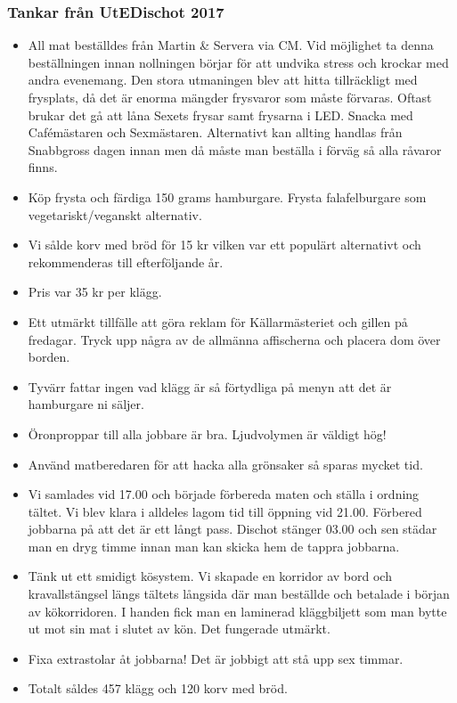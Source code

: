 \documentclass[10pt]{article}
\begin{document}
\subsubsection*{Tankar från UtEDischot 2017}
\begin{itemize}
	\item All mat beställdes från Martin \& Servera via CM. Vid möjlighet ta denna beställningen innan nollningen börjar för att undvika stress och krockar med andra evenemang. Den stora utmaningen blev att hitta tillräckligt med frysplats, då det är enorma mängder frysvaror som måste förvaras. Oftast brukar det gå att låna Sexets frysar samt frysarna i LED. Snacka med Cafémästaren och Sexmästaren. Alternativt kan allting handlas från Snabbgross dagen innan men då måste man beställa i förväg så alla råvaror finns.
    \item Köp frysta och färdiga 150 grams hamburgare. Frysta falafelburgare som vegetariskt/veganskt alternativ.
    \item Vi sålde korv med bröd för 15 kr vilken var ett populärt alternativt och rekommenderas till efterföljande år.
    \item Pris var 35 kr per klägg.
    \item Ett utmärkt tillfälle att göra reklam för Källarmästeriet och gillen på fredagar. Tryck upp några av de allmänna affischerna och placera dom över borden.
    \item Tyvärr fattar ingen vad klägg är så förtydliga på menyn att det är hamburgare ni säljer.
    \item Öronproppar till alla jobbare är bra. Ljudvolymen är väldigt hög!
    \item Använd matberedaren för att hacka alla grönsaker så sparas mycket tid.
    \item Vi samlades vid 17.00 och började förbereda maten och ställa i ordning tältet. Vi blev klara i alldeles lagom tid till öppning vid 21.00. Förbered jobbarna på att det är ett långt pass. Dischot stänger 03.00 och sen städar man en dryg timme innan man kan skicka hem de tappra jobbarna.
    \item Tänk ut ett smidigt kösystem. Vi skapade en korridor av bord och kravallstängsel längs tältets långsida där man beställde och betalade i början av kökorridoren. I handen fick man en laminerad kläggbiljett som man bytte ut mot sin mat i slutet av kön. Det fungerade utmärkt.
    \item Fixa extrastolar åt jobbarna! Det är jobbigt att stå upp sex timmar.
    \item Totalt såldes 457 klägg och 120 korv med bröd.

\end{itemize}
\end{document}
